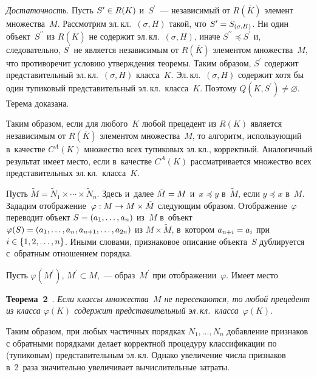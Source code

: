 \begin{multicols}{2}
  \textit{Достаточность}. Пусть $S^\prime\hm\in R(K)$ и~$S^\prime$~--- 
независимый от $R(\overline{K})$ элемент множества~$M$. Рассмотрим 
эл.\,кл.\ $(\sigma, H)$ такой, что $S^\prime\hm= S_{(\sigma,H)}$. Ни один 
объект~$S^{\prime\prime}$ из $R(\overline{K})$ не содержит эл.\,кл.\ $(\sigma, 
H)$, иначе $S^{\prime\prime}\preceq S^\prime$ и, следовательно, $S^\prime$ не 
является независимым от $R(\overline{K})$ элементом множества~$M$, что 
противоречит условию утверждения теоремы. Таким образом, $S^\prime$ 
содержит представительный эл.\,кл.\ $(\sigma, H)$ класса~$K$. Эл.\,кл.\ 
$(\sigma, H)$ содержит хотя бы один тупиковый представительный эл.\,кл.\ 
класса~$K$. Поэтому $Q(K, S^\prime)\not= \varnothing$. Терема доказана.
  
  Таким образом, если для любого~$K$ любой прецедент из $R(K)$ является 
независимым от $R(\overline{K})$ элементом множества~$M$, то алгоритм, 
ис\-поль\-зу\-ющий в~качестве $C^A(K)$ множество всех тупиковых эл.\,кл., 
корректный. Аналогичный результат имеет место, если в~качестве $C^A(K)$ 
рассматривается множество всех представительных эл.\,кл.\ класса~$K$. 
  
  Пусть $\tilde{M}=\tilde{N}_1\times \cdots \times \tilde{N}_n$. Здесь и~далее 
$\tilde{M}\hm= M$ и~$x\preceq y$ в~$\tilde{M}$, если $y\preceq x$ в~$M$. 
Зададим отображение~$\varphi: M\hm\to M\times \tilde{M}$ сле\-ду\-ющим 
образом. Отображение~$\varphi$ переводит объект $S\hm= (a_1,  \ldots, a_n)$ 
из~$M$  в~объект $\varphi(S)\hm= (a_1, \ldots , a_n, a_{n+1}, \ldots , a_{2n})$ из 
$M\times \tilde{M}$, в~котором $a_{n+i}\hm=a_i$ при $i\hm \in \{1,2,\ldots , 
n\}$. Иными словами, признаковое описание объекта~$S$ дублируется 
с~обратным отношением порядка.
  
  Пусть $\varphi(M^\prime)$, $M^\prime \subset M$,~--- образ~$M^\prime$ при 
отображении~$\varphi$. Имеет \mbox{место}
  
  \smallskip
  
  \noindent
  \textbf{Теорема~2}~\cite{2-duk}. \textit{Если классы множества~$M$ не 
пересекаются, то любой прецедент из класса $\varphi(K)$ содержит 
представительный эл.\,кл.\ класса}~$\varphi(K)$.
  
  \smallskip
  
  Таким образом, при любых частичных порядках $N_1,\ldots , N_n$ 
добавление признаков с обратными порядками делает корректной процедуру 
классификации по (тупиковым) представительным эл.\,кл. Однако увеличение 
числа признаков в~2~раза значительно увеличивает вычислительные затраты.
  

\end{multicols}
